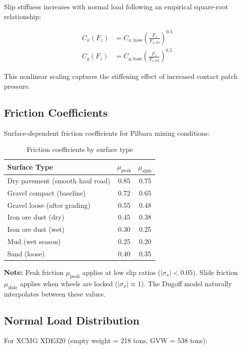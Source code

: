 \documentclass[11pt,a4paper]{article}
\begin{document}
Slip stiffness increases with normal load following an empirical square-root relationship:

\begin{align}
C_x(F_z) &= C_{x,\text{base}} \left(\frac{F_z}{F_{z,\text{ref}}}\right)^{0.5} \\
C_y(F_z) &= C_{y,\text{base}} \left(\frac{F_z}{F_{z,\text{ref}}}\right)^{0.5}
\end{align}

This nonlinear scaling captures the stiffening effect of increased contact patch pressure.

\subsection{Friction Coefficients}

Surface-dependent friction coefficients for Pilbara mining conditions:

\begin{table}[h]
\centering
\begin{tabular}{lcc}
\hline
\textbf{Surface Type} & $\mu_{\text{peak}}$ & $\mu_{\text{slide}}$ \\
\hline
Dry pavement (smooth haul road) & 0.85 & 0.75 \\
Gravel compact (baseline) & 0.72 & 0.65 \\
Gravel loose (after grading) & 0.55 & 0.48 \\
Iron ore dust (dry) & 0.45 & 0.38 \\
Iron ore dust (wet) & 0.30 & 0.25 \\
Mud (wet season) & 0.25 & 0.20 \\
Sand (loose) & 0.40 & 0.35 \\
\hline
\end{tabular}
\caption{Friction coefficients by surface type}
\label{tab:friction}
\end{table}

\textbf{Note:} Peak friction $\mu_{\text{peak}}$ applies at low slip ratios ($|\sigma_x| < 0.05$). Slide friction $\mu_{\text{slide}}$ applies when wheels are locked ($|\sigma_x| \approx 1$). The Dugoff model naturally interpolates between these values.

\subsection{Normal Load Distribution}

For XCMG XDE320 (empty weight = 218 tons, GVW = 538 tons):
\end{document}
